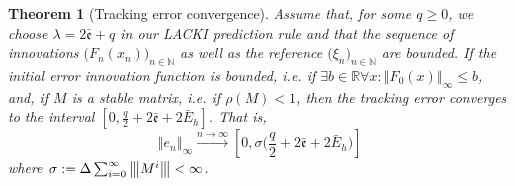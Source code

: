 \documentclass{article} %
\newtheorem{thm}{Theorem}[section]
\theoremstyle{definition}
\theoremstyle{remark}
\newcommand{\matnorm}[1]{{\left\vert\kern-0.25ex\left\vert\kern-0.25ex\left\vert #1 
    \right\vert\kern-0.25ex\right\vert\kern-0.25ex\right\vert}}
\newcommand{\norm}[1]{\left\Vert#1\right\Vert}
\newcommand{\Real}{\mathbb R}
\newcommand{\nat}{\mathbb N}
\newcommand{\specrad}{\rho}
\newcommand{\hestthresh}{\ensuremath{ \lambda}}
\newcommand{\obserrbnd}{\bar{\mathfrak e}}
\newcommand{\seq}[2]{\ensuremath{\bigl(#1\bigr)_{#2}}}
\newcommand{\tinc}{\ensuremath{ \Delta}}
\begin{document}
\begin{thm}[Tracking error convergence]
\label{thm:trackerrconv}
Assume that, for some $q\geq0$, we choose $\hestthresh = 2 \obserrbnd + q$ in our LACKI prediction rule and that the sequence of innovations $\seq{F_n(x_n)}{n\in \nat} $ as well as the reference $\seq{\xi_n}{n \in \nat}$ are bounded. 
If the initial error innovation function is bounded, i.e. if $\exists b \in \Real \forall x: \norm{F_0(x)}_\infty \leq b $, and, if $M$ is a stable matrix, i.e. if $\specrad(M) <1$, then the tracking error converges to the interval $[0,\frac q 2 + 2  \obserrbnd  + 2 \bar E_h]$. That is,
\[\norm{e_n}_\infty \stackrel{n \to \infty}{\longrightarrow} [0, \sigma\bigl(\frac q 2 + 2  \obserrbnd  + 2 \bar E_h\bigr )] \]
where $\sigma := \tinc  \sum_{i=0}^\infty \matnorm{M^i} < \infty$.

\end{thm}
\end{document}
